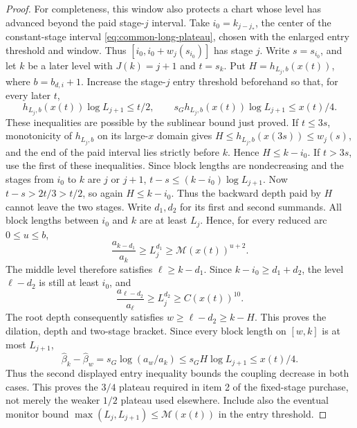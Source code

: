\begin{proof}
For completeness, this window also protects a chart whose level has
advanced beyond the paid stage-$j$ interval. Take $i_0=k_{j-j_*}$, the center of the constant-stage interval
\eqref{eq:common-long-plateau}, chosen with the enlarged entry threshold
and window. Thus $[i_0,i_0+w_j(s_{i_0})]$ has stage $j$.
Write $s=s_{i_0}$, and let $k$ be a later level with $J(k)=j+1$
and $t=s_k$. Put $H=h_{L_j,b}(x(t))$, where $b=b_{d,i}+1$.
Increase the stage-$j$ entry threshold beforehand so that, for every
later $t$,
\[
 h_{L_j,b}(x(t))\log L_{j+1}\le t/2,\qquad
 s_Gh_{L_j,b}(x(t))\log L_{j+1}\le x(t)/4.
\]
These inequalities are possible by the sublinear bound just proved.
If $t\le3s$, monotonicity of
$h_{L_j,b}$ on its large-$x$ domain gives
$H\le h_{L_j,b}(x(3s))\le w_j(s)$, and the end of the paid interval
lies strictly before $k$. Hence $H\le k-i_0$. If $t>3s$, use the first of these inequalities. Since block lengths are nondecreasing and the stages
from $i_0$ to $k$ are $j$ or $j+1$,
$t-s\le(k-i_0)\log L_{j+1}$. Now $t-s>2t/3>t/2$, so again
$H\le k-i_0$. Thus the backward depth paid by $H$ cannot leave the two
stages. Write $d_1,d_2$ for its first and second summands. All block
lengths between $i_0$ and $k$ are at least $L_j$. Hence, for every
reduced arc $0\le u\le b$,
\[
 \frac{a_{k-d_1}}{a_k}\ge L_j^{d_1}\ge\mathcal M(x(t))^{u+2}.
\]
The middle level therefore satisfies $\ell\ge k-d_1$. Since
$k-i_0\ge d_1+d_2$, the level $\ell-d_2$ is still at least $i_0$,
and
\[
 \frac{a_{\ell-d_2}}{a_\ell}\ge L_j^{d_2}\ge C(x(t))^{10}.
\]
The root depth consequently satisfies $w\ge\ell-d_2\ge k-H$.
This proves the dilation, depth and two-stage bracket. Since every block
length on $[w,k]$ is at most $L_{j+1}$,
\[
 \widehat\beta_k-\widehat\beta_w
   =s_G\log(a_w/a_k)\le s_GH\log L_{j+1}\le x(t)/4.
\]
Thus the second displayed entry inequality bounds the coupling decrease
in both cases. This proves the
$3/4$ plateau required in item 2 of the fixed-stage purchase, not merely the weaker $1/2$
plateau used elsewhere. Include also the eventual monitor bound
$\max(L_j,L_{j+1})\le\mathcal M(x(t))$ in the entry threshold.


\end{proof}
